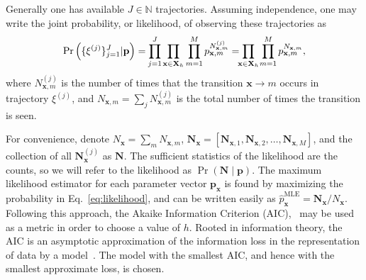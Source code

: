 \documentclass[prl,twocolumn,groupedaddress]{revtex4-1}
\newcommand{\bN}{\mathbf{N}}
\newcommand{\bx}{\mathbf{x}}
\newcommand{\bp}{\mathbf{p}}
\begin{document}
Generally one has available  $J\in\mathbb{N}$ trajectories. Assuming independence, one may write the joint probability, or likelihood, of observing these trajectories as
\begin{align}
\Pr\left(\{\xi^{(j)} \}_{j=1}^J \vert \bp\right) = \smashoperator{\prod_{j=1}^J} \prod_{\bx\in\mathbf{X}_h} \prod_{m=1}^M p_{\bx,m}^{N^{(j)}_{\bx,m}} = \smashoperator{\prod_{\bx\in\mathbf{X}_h} }\ \prod_{m=1}^M p_{\bx,m}^{N_{\bx,m}} ,
\label{eq:likelihood}
\end{align}
where $N^{(j)}_{\bx,m}$ is the number of times that the transition $\bx\to m$ occurs in trajectory $\xi^{(j)}$, and $N_{\bx,m} = \sum_j N^{(j)}_{\bx,m}$ is the total number of times the transition is seen.%

For convenience,  denote $N_{\bx} =\sum_{m}N_{\bx,m}$,  $\bN_{\bx}= [\bN_{\bx,1},\bN_{\bx,2},\ldots,\bN_{\bx,M}]$, and the collection of all $\bN^{(j)}_{\bx}$ as $\bN$. The sufficient statistics of the likelihood are the counts, so we will refer to the likelihood as $\Pr(\bN\mid\bp)$. The maximum likelihood estimator for each parameter vector $\bp_\bx$ is found by maximizing the probability in Eq.~\ref{eq:likelihood}, and can be written easily as
$\hat{p}^{\textrm{MLE}}_{\bx} = \mathbf{N}_{\bx} / N_{\bx}$. 
Following this approach, the Akaike Information Criterion (AIC),~\cite{akaike1974new,tong1975determination,katz1981some}  %
 may be used as a metric in order to choose a value of $h$.  Rooted in information theory, the AIC is an asymptotic approximation of the information loss in the representation of data by a model~\cite{burnham2003model}. The model with the smallest AIC, and hence with the smallest approximate loss, is chosen.
\end{document}
